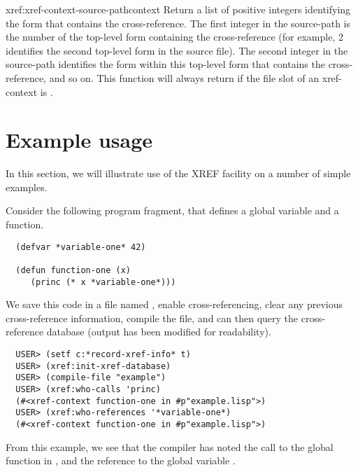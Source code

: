 \begin{defun}{xref:}{xref-context-source-path}{context}
  Return a list of positive integers identifying the form that
  contains the cross-reference. The first integer in the source-path
  is the number of the top-level form containing the cross-reference
  (for example, 2 identifies the second top-level form in the source
  file). The second integer in the source-path identifies the form
  within this top-level form that contains the cross-reference, and so
  on. This function will always return \nil{} if the file slot of an
  xref-context is \nil{}.

\end{defun}




\section{Example usage}

In this section, we will illustrate use of the XREF facility on a
number of simple examples.

Consider the following program fragment, that defines a global
variable and a function.

\begin{verbatim}
  (defvar *variable-one* 42)
  
  (defun function-one (x)
     (princ (* x *variable-one*)))
\end{verbatim}

We save this code in a file named , enable
cross-referencing, clear any previous cross-reference information,
compile the file, and can then query the cross-reference database
(output has been modified for readability).

\begin{verbatim}
  USER> (setf c:*record-xref-info* t)
  USER> (xref:init-xref-database)
  USER> (compile-file "example")
  USER> (xref:who-calls 'princ)
  (#<xref-context function-one in #p"example.lisp">)
  USER> (xref:who-references '*variable-one*)
  (#<xref-context function-one in #p"example.lisp">)
\end{verbatim}

From this example, we see that the compiler has noted the call to the
global function  in , and the reference
to the global variable . 

